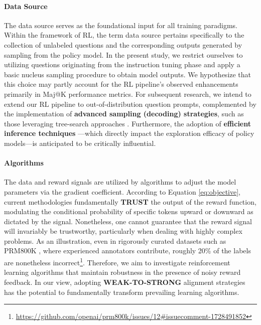 \begin{itemize}[topsep=0pt]
\paragraph{Data Source} The data source serves as the foundational input for all training paradigms. Within the framework of RL, the term data source pertains specifically to the collection of unlabeled questions and the corresponding outputs generated by sampling from the policy model. In the present study, we restrict ourselves to utilizing questions originating from the instruction tuning phase and apply a basic nucleus sampling procedure to obtain model outputs. We hypothesize that this choice may partly account for the RL pipeline’s observed enhancements primarily in Maj@K performance metrics. For subsequent research, we intend to extend our RL pipeline to out-of-distribution question prompts, complemented by the implementation of \textbf{advanced sampling (decoding) strategies}, such as those leveraging tree-search approaches \citep{yao2023tree}. Furthermore, the adoption of \textbf{efficient inference techniques} \citep{xia-etal-2023-speculative,leviathan2023fast,kwon2023efficient,xia2024unlocking}—which directly impact the exploration efficacy of policy models—is anticipated to be critically influential.

\paragraph{Algorithms} The data and reward signals are utilized by algorithms to adjust the model parameters via the gradient coefficient. According to Equation \ref{eq:objective}, current methodologies fundamentally \textbf{TRUST} the output of the reward function, modulating the conditional probability of specific tokens upward or downward as dictated by the signal. Nonetheless, one cannot guarantee that the reward signal will invariably be trustworthy, particularly when dealing with highly complex problems. As an illustration, even in rigorously curated datasets such as PRM800K \citep{lightman2023let}, where experienced annotators contribute, roughly 20\% of the labels are nonetheless incorrect\footnote{\url{https://github.com/openai/prm800k/issues/12\#issuecomment-1728491852}}. Therefore, we aim to investigate reinforcement learning algorithms that maintain robustness in the presence of noisy reward feedback. In our view, adopting \textbf{WEAK-TO-STRONG} \citep{burns2023weak} alignment strategies has the potential to fundamentally transform prevailing learning algorithms.


\end{itemize}
